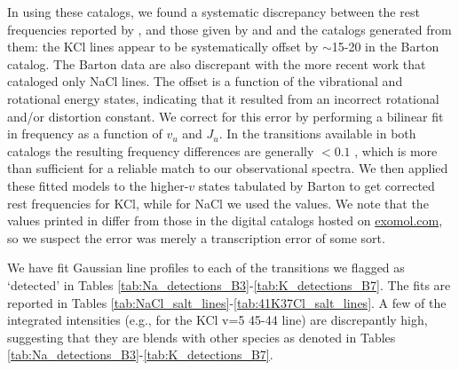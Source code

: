 \documentclass[twocolumn]{aastex62}
\begin{document}
In using these catalogs, we found a systematic discrepancy between the rest
frequencies reported by \citet{Barton2014a}, and those given by
\citet{Caris2004a} and \citet{Caris2002a} and the catalogs generated from them:
the KCl lines appear to be systematically offset by $\sim$15-20 \kms in the
Barton catalog.  The Barton data are also discrepant with the more recent
\citet{Cabezas2016a} work that cataloged only NaCl lines. The offset is a
function of the vibrational and rotational energy states, indicating that it
resulted from an incorrect rotational and/or distortion constant.  We correct
for this error by performing a bilinear fit in frequency as a function of $v_u$
and $J_u$.  In the transitions available in both catalogs the resulting
frequency differences are generally $<0.1$ \kms, which is more than sufficient
for a reliable match to our observational spectra.  We then applied these
fitted models to the higher-$v$ states tabulated by Barton to get corrected
rest frequencies for KCl, while for NaCl we used the \citet{Cabezas2016a}
values.  We note that the values printed in \citet{Barton2014a} differ from
those in the digital catalogs hosted on \url{exomol.com}, so we suspect the
error was merely a transcription error of some sort.


%
%
%








We have fit Gaussian line profiles to each of the transitions we flagged as
`detected' in Tables \ref{tab:Na_detections_B3}-\ref{tab:K_detections_B7}.
The fits are reported in Tables
\ref{tab:NaCl_salt_lines}-\ref{tab:41K37Cl_salt_lines}.  
A few of the integrated intensities (e.g., for the KCl v=5 45-44 line) are discrepantly
high, suggesting that they are blends with other species as denoted in 
Tables \ref{tab:Na_detections_B3}-\ref{tab:K_detections_B7}.
\end{document}
